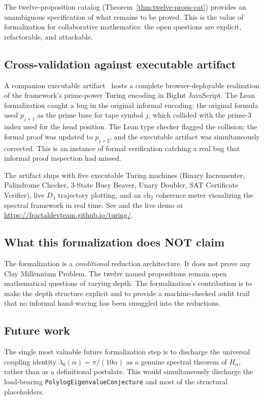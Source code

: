 \documentclass[11pt,a4paper]{article}
\theoremstyle{definition}
\begin{document}
The twelve-proposition catalog (Theorem~\ref{thm:twelve-props-cat})
provides an unambiguous specification of what remains to be proved.
This is the value of formalization for collaborative mathematics:
the open questions are explicit, refactorable, and attackable.

\subsection{Cross-validation against executable artifact}

A companion executable artifact~\cite{cohen2026turing} hosts a complete
browser-deployable realization of the framework's prime-power Turing
encoding in BigInt JavaScript. The Lean formalization caught a bug in
the original informal encoding: the original formula used
$p_{j+1}$ as the prime base for tape symbol $j$, which collided with
the prime-$3$ index used for the head position. The Lean type checker
flagged the collision; the formal proof was updated to $p_{j+2}$, and
the executable artifact was simultaneously corrected. This is an
instance of formal verification catching a real bug that informal
proof inspection had missed.

The artifact ships with five executable Turing machines (Binary
Incrementer, Palindrome Checker, 3-State Busy Beaver, Unary Doubler,
SAT Certificate Verifier), live $D_3$ trajectory plotting, and an
$\mathrm{ch}_2$ coherence meter visualizing the spectral framework
in real time. See \cite{cohen2026turing} and the live demo at
\url{https://fractaldevteam.github.io/turing/}.

\subsection{What this formalization does NOT claim}

The formalization is a \emph{conditional} reduction architecture. It
does not prove any Clay Millennium Problem. The twelve named
propositions remain open mathematical questions of varying depth. The
formalization's contribution is to make the depth structure explicit
and to provide a machine-checked audit trail that no informal
hand-waving has been smuggled into the reductions.

\subsection{Future work}

The single most valuable future formalization step is to discharge
the universal coupling identity $\lambda_0(\alpha) = \pi/(10\alpha)$
as a genuine spectral theorem of $H_\alpha$, rather than as a
definitional postulate. This would simultaneously discharge the
load-bearing \texttt{PolylogEigenvalueConjecture} and most of the
structural placeholders.
\end{document}
